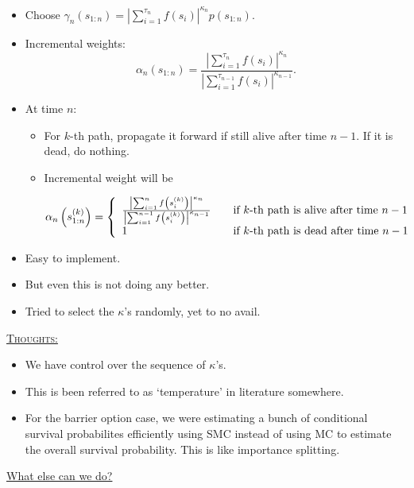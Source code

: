 \documentclass{article}
\begin{document}
\begin{itemize}

\item Choose $ \gamma_{n}(s_{1:n}) = | \sum_{i=1}^{\tau_{n}} f(s_{i}) |^{\kappa_{n}} p(s_{1:n})$.

\item Incremental weights: 
$$ \alpha_{n}(s_{1:n}) = \frac{ \left | \sum_{i=1}^{\tau_{n}} f(s_{i}) \right |^{\kappa_{n}} }{ \left | \sum_{i=1}^{\tau_{n-1}} f(s_{i}) \right |^{\kappa_{n-1}} }. $$ 

\item At time $n$: 
\begin{itemize} 
\item For $k$-th path, propagate it forward if still alive after time $n-1$. If it is dead, do nothing. 

\item Incremental weight will be

\[ \alpha_{n} \left ( s_{1:n}^{(k)} \right ) = \left\{ 
  \begin{array}{l l}
    \frac{ \left | \sum_{i=1}^{n} f \left ( s_{i}^{(k)} \right ) \right |^{\kappa_{n}} }{ \left | \sum_{i=1}^{n-1} f \left ( s_{i}^{(k)} \right ) \right |^{\kappa_{n-1}} } & \quad \text{if $k$-th path is alive after time $n-1$}\\
   1 & \quad \text{if $k$-th path is dead after time $n-1$}
  \end{array} \right.\]

\end{itemize}

\item Easy to implement.

\item But even this is not doing any better. 

\item Tried to select the $\kappa$'s randomly, yet to no avail.

\end{itemize}
\underline{\textsc{Thoughts:}}

\begin{itemize}

\item We have control over the sequence of $\kappa$'s. 
\item This is been referred to as `temperature' in literature somewhere.
\item For the barrier option case, we were estimating a bunch of conditional survival probabilites efficiently using SMC instead of using MC to estimate the overall survival probability. This is like importance splitting.
 
\end{itemize} 
\vspace{0.2in}
\underline{What else can we do?} 
\end{document}

